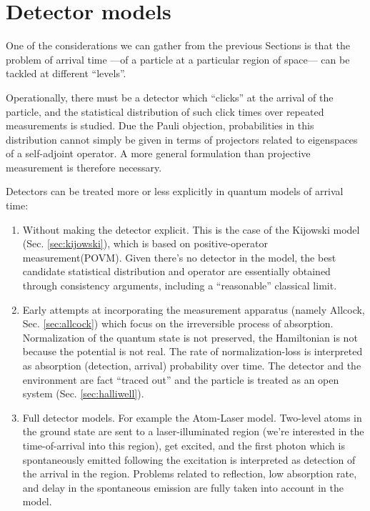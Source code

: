 \section{Detector models}\label{sec:hist:detect}

One of the considerations we can gather from the previous Sections
is that 
the problem of arrival time ---of a particle at a particular region of space---
can be tackled at different ``levels''. 

Operationally, there must be a detector which
``clicks'' at the arrival of the particle, and the statistical distribution of
such click times over repeated measurements is studied. Due the Pauli objection,
probabilities in this distribution cannot simply be given in terms of projectors related to eigenspaces of a self-adjoint operator.
A more general formulation than projective measurement is therefore necessary.

Detectors can be treated more or less explicitly in quantum models of arrival time:
\begin{enumerate}
  \item
    Without making the detector explicit. This is the case of the Kijowski model (Sec. \ref{sec:kijowski}),
    which is based on positive-operator measurement\linebreak(POVM). Given there's no detector in the model,
    the best candidate statistical distribution and operator are essentially obtained
    through consistency arguments, including a ``reasonable'' classical limit.
  \item
    Early attempts at incorporating the measurement apparatus
    (namely Allcock, Sec. \ref{sec:allcock}) which
    focus on the irreversible process of absorption.
    Normalization of the quantum state is not preserved, the Hamiltonian is not
    because the potential is not real. The rate of normalization-loss is interpreted as
    absorption (detection, arrival) probability over time. The detector and the environment are fact
    ``traced out'' and the particle is treated as an open system (Sec. \ref{sec:halliwell}).
  \item
    Full detector models. For example the Atom-Laser model. Two-level atoms in the ground state
    are sent to a laser-illuminated region (we're interested in the time-of-arrival into this region),
    get excited, and the first photon which is spontaneously emitted following the excitation
    is interpreted as detection of the arrival in the region. Problems related to
    reflection, low absorption rate, and delay in the spontaneous emission are fully taken into account in the model.
\end{enumerate}

